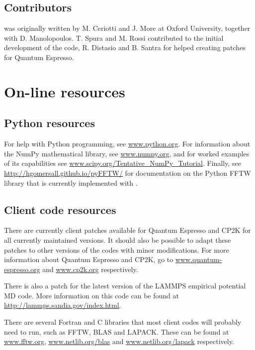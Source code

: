 \documentclass[11pt,english,fleqn]{report}
\begin{document}
\subsection{Contributors}

\ipi was originally written by M. Ceriotti and J. More at Oxford University,
together with D. Manolopoulos. T. Spura and M. Rossi contributed to the 
initial development of the code, R. Distasio and B. Santra for helped creating patches for
Quantum Espresso.



\section{On-line resources}


\subsection{Python resources}

For help with Python programming, see \url{www.python.org}. For information
about the NumPy mathematical library, see \url{www.numpy.org}, and
for worked examples of its capabilities see \url{www.scipy.org/Tentative_NumPy_Tutorial}.
Finally, see \url{http://hgomersall.github.io/pyFFTW/} for documentation
on the Python FFTW library that is currently implemented with \ipi.


\subsection{Client code resources}

\label{librarywebsites}

There are currently client patches available for Quantum Espresso
and CP2K for all currently maintained versions. It should also 
be possible to adapt these patches
to other versions of the codes with minor modifications. For more
information about Quantum Espresso and CP2K, go to \url{www.quantum-espresso.org}
and \url{www.cp2k.org} respectively.

There is also a patch for the latest version of the LAMMPS empirical potential MD code.
More information on this code can be found at \url{http://lammps.sandia.gov/index.html}.

There are several Fortran and C libraries that most client codes will
probably need to run, such as FFTW, BLAS and LAPACK. These can be
found at \url{www.fftw.org}, \url{www.netlib.org/blas} and \url{www.netlib.org/lapack}
respectively.
\end{document}
